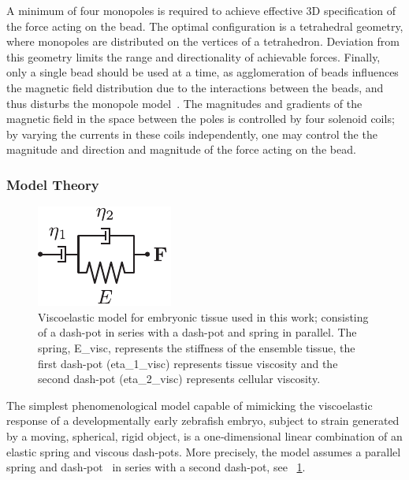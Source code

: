 A minimum of four monopoles is required to achieve effective 3D specification of the force acting on the bead.
The optimal configuration is a tetrahedral geometry, where monopoles are distributed on the vertices of a tetrahedron.
Deviation from this geometry limits the range and directionality of achievable forces.
Finally, only a single bead should be used at a time, as agglomeration of beads influences the magnetic field distribution due to the interactions between the beads, and thus disturbs the monopole model~\cite{bauschMeasurementLocalViscoelasticity1999}.
The magnitudes and gradients of the magneticfield in the space between the poles is controlled by four solenoid coils; by varying the currents in these coils independently, one may control the the magnitude and direction and magnitude of the force acting on the bead.

\subsubsection{Model Theory}

\begin{figure}
 \centering
 \includegraphics{Chapters/tweezers/Figs/PDF/viscoelastic_model}
 \caption[Viscoelastic model for embryonic tissue]{
 Viscoelastic model for embryonic tissue used in this work; consisting of a dash-pot in series with a dash-pot and spring in parallel.
 The spring, \gls{E_visc}, represents the stiffness of the ensemble tissue, the first dash-pot (\gls{eta_1_visc}) represents tissue viscosity and the second dash-pot (\gls{eta_2_visc}) represents cellular viscosity.
 }\label{fig:viscoelastic_model}
\end{figure}

The simplest phenomenological model capable of mimicking the viscoelastic response of a developmentally early \gls{zebrafish} embryo, subject to strain generated by a moving, spherical, rigid object, is a one‐dimensional linear combination of an elastic spring and viscous dash‐pots.
More precisely, the model assumes a parallel spring and dash‐pot~\cite{meyersMechanicalBehaviorMaterials2008} in series with a second dash‐pot, see \figurename~\ref{fig:viscoelastic_model}.

